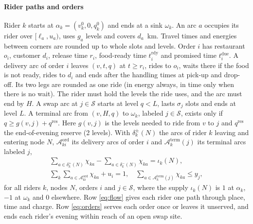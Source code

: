 \paragraph*{Rider paths and orders}
Rider $k$ starts at $\alpha_k=(v^0_k,0,q^0_k)$ and ends at a sink $\omega_k$. An arc $a$ occupies its rider over $[\ell_a,u_a)$, uses $g_a$ levels and covers $d_a$~km. Travel times and energies between corners are rounded up to whole slots and levels. Order $i$ has restaurant $o_i$, customer $d_i$, release time $r_i$, food-ready time $t^{\mathrm{rdy}}_i$ and promised time $t^{\mathrm{due}}_i$. A delivery arc of order $i$ leaves $(v,t,q)$ at $t\ge r_i$, rides to $o_i$, waits there if the food is not ready, rides to $d_i$ and ends after the handling times at pick-up and drop-off. Its two legs are rounded as one ride (in energy always, in time only when there is no wait). The rider must hold the levels the ride uses, and the arc must end by $H$. A swap arc at $j\in\mathcal S$ starts at level $q<L$, lasts $\sigma_j$ slots and ends at level $L$. A terminal arc from $(v,H,q)$ to $\omega_k$, labeled $j\in\mathcal S$, exists only if $q\ge g(v,j)+q^{\mathrm{res}}$. Here $g(v,j)$ is the levels needed to ride from $v$ to $j$ and $q^{\mathrm{res}}$ the end-of-evening reserve (2 levels). With $\delta^\pm_k(N)$ the arcs of rider $k$ leaving and entering node $N$, $\mathcal A^{\mathrm{ord}}_{ki}$ its delivery arcs of order $i$ and $\mathcal A^{\mathrm{term}}_k(j)$ its terminal arcs labeled $j$,
\begin{gather}
  \textstyle\sum_{a\in\delta^+_k(N)}\chi_{ka}-\sum_{a\in\delta^-_k(N)}\chi_{ka}=\iota_k(N),\label{eq:flow}\\
  \textstyle\sum_{k}\sum_{a\in\mathcal A^{\mathrm{ord}}_{ki}}\chi_{ka}+u_i=1,\quad
  \sum_{a\in\mathcal A^{\mathrm{term}}_k(j)}\chi_{ka}\le y_j,\label{eq:orders}
\end{gather}
for all riders $k$, nodes $N$, orders $i$ and $j\in\mathcal S$, where the supply $\iota_k(N)$ is $1$ at $\alpha_k$, $-1$ at $\omega_k$ and 0 elsewhere. Row \eqref{eq:flow} gives each rider one path through place, time and charge. Row \eqref{eq:orders} serves each order once or leaves it unserved, and ends each rider's evening within reach of an open swap site.


